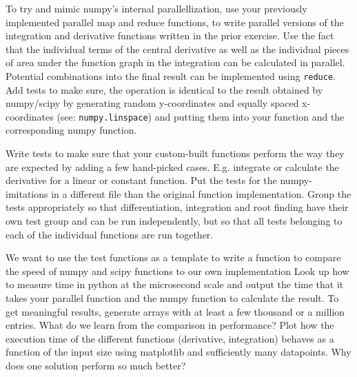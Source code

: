 \documentclass[]{erlangen-problemset}
\begin{document}
\begin{problem}[title={Parallel numpy/scipy replacement}]
\noindent
\Question To try and mimic numpy's internal parallellization, use your previously implemented parallel map and reduce functions, to write parallel versions of the integration and derivative functions written in the prior exercise. 
Use the fact that the individual terms of the central derivative as well as the individual pieces of area under the function graph in the integration can be calculated in parallel. 
Potential combinations into the final result can be implemented using  \texttt{reduce}.
\Question Add tests to make sure, the operation is identical to the result obtained by numpy/scipy by generating random y-coordinates and equally spaced x-coordinates (see: \texttt{numpy.linspace}) and putting them into your function and the corresponding numpy function.

\Question Write tests to make sure that your custom-built functions perform the way they are expected by adding a few hand-picked cases. 
E.g. integrate or calculate the derivative for a linear or constant function.
\Question Put the tests for the numpy-imitations in a different file than the original function implementation.
\Question Group the tests appropriately so that differentiation, integration and root finding have their own test group and can be run independently, but so that all tests belonging to each of the individual functions are run together.
\end{problem}

\begin{problem}[title={Measuring performance}]
We want to use the test functions as a template to write a function to compare the speed of numpy and scipy functions to our own implementation
\noindent
\Question Look up how to measure time in python at the microsecond scale and output the time that it takes your parallel function and the numpy function to calculate the result. To get meaningful results, generate arrays with at least a few thousand or a million entries.
\Question What do we learn from the comparison in performance?
\Question Plot how the execution time of the different functions (derivative, integration) behaves as a function of the input size using matplotlib and sufficiently many datapoints.
\Question Why does one solution perform so much better?
\end{problem}
\end{document}
